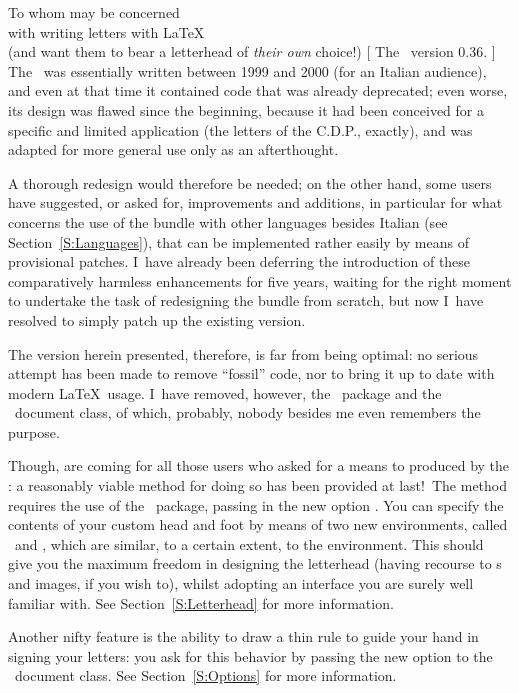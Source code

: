\begin{letterhead}{
	To whom may be concerned\\
	with writing letters with \LaTeX\\
	(and want them to bear a letterhead
	of \emph{their own} choice!)
}[
	The \Bundle\ version 0.36.
]
The \Bundle\ was essentially written between 1999 and 2000 (for an Italian
audience), and even at that time it contained code that was already deprecated;
even worse, its design was flawed since the beginning, because it had been
conceived for a specific and limited application (the letters of the C.D.P.,
exactly), and was adapted for more general use only as an afterthought.

A thorough redesign would therefore be needed; on the other hand, some users
have suggested, or asked for, improvements and additions, in particular for what
concerns the use of the bundle with other languages besides Italian (see
Section~\ref{S:Languages}), that can be implemented rather easily by means of
provisional patches.  I~have already been deferring the introduction of these
comparatively harmless enhancements for five years, waiting for the right moment
to undertake the task of redesigning the bundle from scratch, but now I~have
resolved to simply patch up the existing version.

The version herein presented, therefore, is far from being optimal: no serious
attempt has been made to remove ``fossil'' code, nor to bring it up to date with
modern \LaTeX\ usage.  I~have removed, however, the \adip\ package and the
\adic\ document class, of which, probably, nobody besides me even remembers the
purpose.

Though,
 are coming for all those users who asked for a means to
 produced by the \Bundle: a reasonably
viable method for doing so has been provided at
last!~\facesmile\facesmile\facesmile\space The method requires the use of the
\cdpa\ package, passing in the new option \oclh.  You can specify the contents
of your custom head and foot by means of two new environments, called \eclh\ and
\eclf, which are similar, to a certain extent, to the 
environment.  This should give you the maximum freedom in designing the
letterhead (having recourse to s and images, if you wish to),
whilst adopting an interface you are surely well familiar with.  See
Section~\ref{S:Letterhead} for more information.

Another nifty feature is the ability to draw a thin rule to guide your hand in
signing your letters: you ask for this behavior by passing the new
 option to the \lcdp\ document class.  See
Section~\ref{S:Options} for more information.


\end{letterhead}
